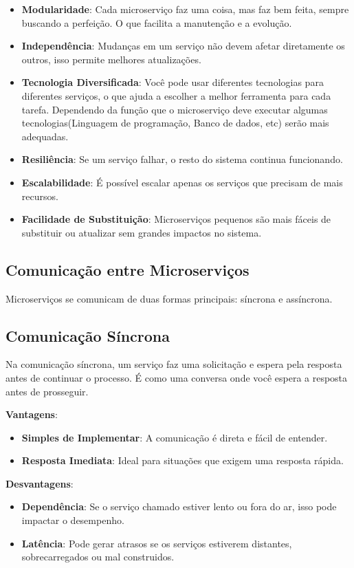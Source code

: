 \documentclass{article}
\begin{document}
	\begin{itemize}
		\item \textbf{Modularidade}: Cada microserviço faz uma coisa, mas faz bem feita, sempre buscando a perfeição. O que facilita a manutenção e a evolução.
		\item \textbf{Independência}: Mudanças em um serviço não devem afetar diretamente os outros, isso permite melhores atualizações.
		\item \textbf{Tecnologia Diversificada}: Você pode usar diferentes tecnologias para diferentes serviços, o que ajuda a escolher a melhor ferramenta para cada tarefa. Dependendo da função que o microserviço deve executar algumas tecnologias(Linguagem de programação, Banco de dados, etc) serão mais adequadas.
		\item \textbf{Resiliência}: Se um serviço falhar, o resto do sistema continua funcionando.
		\item \textbf{Escalabilidade}: É possível escalar apenas os serviços que precisam de mais recursos.
		\item \textbf{Facilidade de Substituição}: Microserviços pequenos são mais fáceis de substituir ou atualizar sem grandes impactos no sistema.
	\end{itemize}
	
	\subsection*{Comunicação entre Microserviços}
	
	Microserviços se comunicam de duas formas principais: síncrona e assíncrona.
	
	\subsection*{Comunicação Síncrona}
	
	Na comunicação síncrona, um serviço faz uma solicitação e espera pela resposta antes de continuar o processo. É como uma conversa onde você espera a resposta antes de prosseguir.
	
	\textbf{Vantagens}:
	\begin{itemize}
		\item \textbf{Simples de Implementar}: A comunicação é direta e fácil de entender.
		\item \textbf{Resposta Imediata}: Ideal para situações que exigem uma resposta rápida.
	\end{itemize}
	
	\textbf{Desvantagens}:
	\begin{itemize}
		\item \textbf{Dependência}: Se o serviço chamado estiver lento ou fora do ar, isso pode impactar o desempenho.
		\item \textbf{Latência}: Pode gerar atrasos se os serviços estiverem distantes, sobrecarregados ou mal construidos.
	\end{itemize}
	
\end{document}
